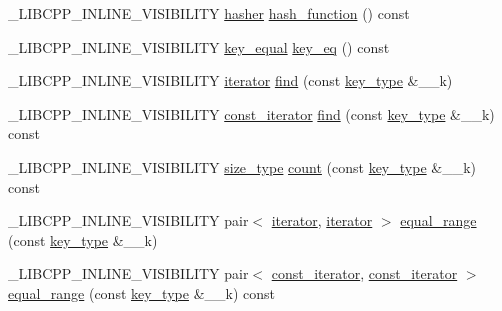 \begin{DoxyCompactItemize}
\item 
\+\_\+\+L\+I\+B\+C\+P\+P\+\_\+\+I\+N\+L\+I\+N\+E\+\_\+\+V\+I\+S\+I\+B\+I\+L\+I\+T\+Y \hyperlink{classunordered__multimap_a93affc33f5ee930cff353ff62d20daef}{hasher} \hyperlink{classunordered__multimap_a20a2773161f7cd24559c6403d33258ad}{hash\+\_\+function} () const 
\item 
\+\_\+\+L\+I\+B\+C\+P\+P\+\_\+\+I\+N\+L\+I\+N\+E\+\_\+\+V\+I\+S\+I\+B\+I\+L\+I\+T\+Y \hyperlink{classunordered__multimap_aeed817e3baaf0771b8336eb2477f4f02}{key\+\_\+equal} \hyperlink{classunordered__multimap_a745f38978a7f48c40f6f596c7063c592}{key\+\_\+eq} () const 
\item 
\+\_\+\+L\+I\+B\+C\+P\+P\+\_\+\+I\+N\+L\+I\+N\+E\+\_\+\+V\+I\+S\+I\+B\+I\+L\+I\+T\+Y \hyperlink{classunordered__multimap_a7b508cae41ac3a258ca80609ec43db47}{iterator} \hyperlink{classunordered__multimap_a20a8a9776e47dac719946a9e14597d20}{find} (const \hyperlink{classunordered__multimap_a2902747087a03531493d30e9840f67d9}{key\+\_\+type} \&\+\_\+\+\_\+k)
\item 
\+\_\+\+L\+I\+B\+C\+P\+P\+\_\+\+I\+N\+L\+I\+N\+E\+\_\+\+V\+I\+S\+I\+B\+I\+L\+I\+T\+Y \hyperlink{classunordered__multimap_a3cb373bd19680f9933781c04905fde39}{const\+\_\+iterator} \hyperlink{classunordered__multimap_acc9160aa6de1c01fae798677ec092dee}{find} (const \hyperlink{classunordered__multimap_a2902747087a03531493d30e9840f67d9}{key\+\_\+type} \&\+\_\+\+\_\+k) const 
\item 
\+\_\+\+L\+I\+B\+C\+P\+P\+\_\+\+I\+N\+L\+I\+N\+E\+\_\+\+V\+I\+S\+I\+B\+I\+L\+I\+T\+Y \hyperlink{classunordered__multimap_a977c4093df6d4d0302f280de19af4b58}{size\+\_\+type} \hyperlink{classunordered__multimap_aebbe635669fe205c8c8bf90ff0c89ef8}{count} (const \hyperlink{classunordered__multimap_a2902747087a03531493d30e9840f67d9}{key\+\_\+type} \&\+\_\+\+\_\+k) const 
\item 
\+\_\+\+L\+I\+B\+C\+P\+P\+\_\+\+I\+N\+L\+I\+N\+E\+\_\+\+V\+I\+S\+I\+B\+I\+L\+I\+T\+Y pair$<$ \hyperlink{classunordered__multimap_a7b508cae41ac3a258ca80609ec43db47}{iterator}, \hyperlink{classunordered__multimap_a7b508cae41ac3a258ca80609ec43db47}{iterator} $>$ \hyperlink{classunordered__multimap_a0c5296b9487a02b76d1aaa65dfab6cbf}{equal\+\_\+range} (const \hyperlink{classunordered__multimap_a2902747087a03531493d30e9840f67d9}{key\+\_\+type} \&\+\_\+\+\_\+k)
\item 
\+\_\+\+L\+I\+B\+C\+P\+P\+\_\+\+I\+N\+L\+I\+N\+E\+\_\+\+V\+I\+S\+I\+B\+I\+L\+I\+T\+Y pair$<$ \hyperlink{classunordered__multimap_a3cb373bd19680f9933781c04905fde39}{const\+\_\+iterator}, \hyperlink{classunordered__multimap_a3cb373bd19680f9933781c04905fde39}{const\+\_\+iterator} $>$ \hyperlink{classunordered__multimap_a440aba305d76b1353960416857f939f4}{equal\+\_\+range} (const \hyperlink{classunordered__multimap_a2902747087a03531493d30e9840f67d9}{key\+\_\+type} \&\+\_\+\+\_\+k) const 

\end{DoxyCompactItemize}
